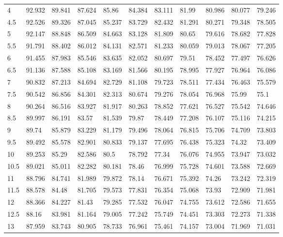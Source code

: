 \begin{bibunit}
\begin{table}[]
\begin{tabular}{lllllllllll}
			4    & 92.932 & 89.841 & 87.624 & 85.86  & 84.384 & 83.111 & 81.99  & 80.986 & 80.077 & 79.246 \\
			4.5  & 92.526 & 89.326 & 87.045 & 85.237 & 83.729 & 82.432 & 81.291 & 80.271 & 79.348 & 78.505 \\
			5    & 92.147 & 88.848 & 86.509 & 84.663 & 83.128 & 81.809 & 80.65  & 79.616 & 78.682 & 77.828 \\
			5.5  & 91.791 & 88.402 & 86.012 & 84.131 & 82.571 & 81.233 & 80.059 & 79.013 & 78.067 & 77.205 \\
			6    & 91.455 & 87.983 & 85.546 & 83.635 & 82.052 & 80.697 & 79.51  & 78.452 & 77.497 & 76.626 \\
			6.5  & 91.136 & 87.588 & 85.108 & 83.169 & 81.566 & 80.195 & 78.995 & 77.927 & 76.964 & 76.086 \\
			7    & 90.832 & 87.213 & 84.694 & 82.729 & 81.108 & 79.723 & 78.511 & 77.434 & 76.463 & 75.579 \\
			7.5  & 90.542 & 86.856 & 84.301 & 82.313 & 80.674 & 79.276 & 78.054 & 76.968 & 75.99  & 75.1   \\
			8    & 90.264 & 86.516 & 83.927 & 81.917 & 80.263 & 78.852 & 77.621 & 76.527 & 75.542 & 74.646 \\
			8.5  & 89.997 & 86.191 & 83.57  & 81.539 & 79.87  & 78.449 & 77.208 & 76.107 & 75.116 & 74.215 \\
			9    & 89.74  & 85.879 & 83.229 & 81.179 & 79.496 & 78.064 & 76.815 & 75.706 & 74.709 & 73.803 \\
			9.5  & 89.492 & 85.578 & 82.901 & 80.833 & 79.137 & 77.695 & 76.438 & 75.323 & 74.32  & 73.409 \\
			10   & 89.253 & 85.29  & 82.586 & 80.5   & 78.792 & 77.34  & 76.076 & 74.955 & 73.947 & 73.032 \\
			10.5 & 89.021 & 85.011 & 82.282 & 80.181 & 78.46  & 76.999 & 75.728 & 74.601 & 73.588 & 72.669 \\
			11   & 88.796 & 84.741 & 81.989 & 79.872 & 78.14  & 76.671 & 75.392 & 74.26  & 73.242 & 72.319 \\
			11.5 & 88.578 & 84.48  & 81.705 & 79.573 & 77.831 & 76.354 & 75.068 & 73.93  & 72.909 & 71.981 \\
			12   & 88.366 & 84.227 & 81.43  & 79.285 & 77.532 & 76.047 & 74.755 & 73.612 & 72.586 & 71.655 \\
			12.5 & 88.16  & 83.981 & 81.164 & 79.005 & 77.242 & 75.749 & 74.451 & 73.303 & 72.273 & 71.338 \\
			13   & 87.959 & 83.743 & 80.905 & 78.733 & 76.961 & 75.461 & 74.157 & 73.004 & 71.969 & 71.031 \\

\end{tabular}
\end{table}
\end{bibunit}
